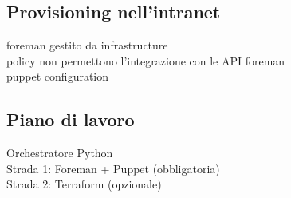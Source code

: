 \subsection{Provisioning nell'intranet}
foreman gestito da infrastructure \\
policy non permettono l'integrazione con le API foreman \\
puppet configuration

\subsection{Piano di lavoro}
Orchestratore Python \\
Strada 1: Foreman + Puppet (obbligatoria) \\
Strada 2: Terraform (opzionale)